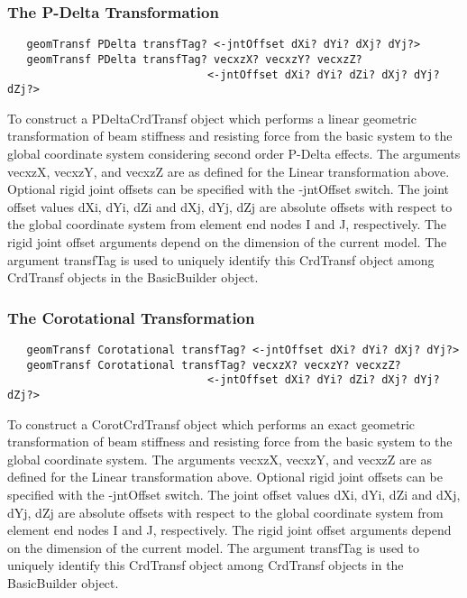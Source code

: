 \documentclass[12pt]{article}
\begin{document}
\subsubsection{The P-Delta Transformation}
{\sf\small
\begin{verbatim}
   geomTransf PDelta transfTag? <-jntOffset dXi? dYi? dXj? dYj?>
   geomTransf PDelta transfTag? vecxzX? vecxzY? vecxzZ? 
                               <-jntOffset dXi? dYi? dZi? dXj? dYj? dZj?>
\end{verbatim}
}

To construct a PDeltaCrdTransf object which performs a linear geometric
transformation of beam stiffness and resisting force from the basic system
to the global coordinate system considering second order P-Delta
effects. The arguments vecxzX, vecxzY, and vecxzZ are as defined for
the Linear transformation above. Optional rigid joint offsets can be
specified with the -jntOffset switch. The joint offset values dXi,
dYi, dZi and dXj, dYj, dZj are absolute offsets with respect to the
global coordinate system from element end  nodes I and J,
respectively. The rigid joint offset arguments depend on the dimension
of the current model. The argument transfTag is used to uniquely
identify this CrdTransf object among CrdTransf objects in the BasicBuilder object.


\subsubsection{The Corotational Transformation}
{\sf\small
\begin{verbatim}
   geomTransf Corotational transfTag? <-jntOffset dXi? dYi? dXj? dYj?>
   geomTransf Corotational transfTag? vecxzX? vecxzY? vecxzZ? 
                               <-jntOffset dXi? dYi? dZi? dXj? dYj? dZj?>
\end{verbatim}
}

To construct a CorotCrdTransf object which performs an exact geometric
transformation of beam stiffness and resisting force from the basic system
to the global coordinate system. The arguments vecxzX, vecxzY, and vecxzZ are as defined for
the Linear transformation above. Optional rigid joint offsets can be
specified with the -jntOffset switch. The joint offset values dXi,
dYi, dZi and dXj, dYj, dZj are absolute offsets with respect to the
global coordinate system from element end nodes I and J,
respectively. The rigid joint offset arguments depend on the dimension
of the current model. The argument transfTag is used to uniquely
identify this CrdTransf object among CrdTransf objects in the BasicBuilder object.
\end{document}
